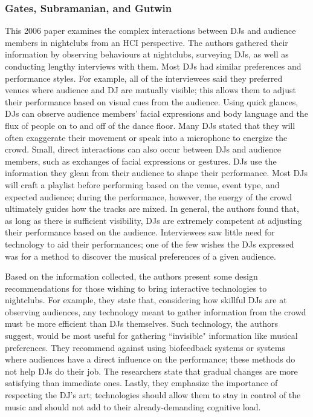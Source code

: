 \subsubsection{Gates, Subramanian, and Gutwin}

This 2006 paper examines the complex interactions between DJs and audience members in nightclubs from an HCI perspective. The authors gathered their information by observing behaviours at nightclubs, surveying DJs, as well as conducting lengthy interviews with them. Most DJs had similar preferences and performance styles. For example, all of the interviewees said they preferred venues where audience and DJ are mutually visible; this allows them to adjust their performance based on visual cues from the audience. Using quick glances, DJs can observe audience members' facial expressions and body language and the flux of people on to and off of the dance floor. Many DJs stated that they will often exaggerate their movement or speak into a microphone to energize the crowd. Small, direct interactions can also occur between DJs and audience members, such as exchanges of facial expressions or gestures. DJs use the information they glean from their audience to shape their performance. Most DJs will craft a playlist before performing based on the venue, event type, and expected audience; during the performance, however, the energy of the crowd ultimately guides how the tracks are mixed. In general, the authors found that, as long as there is sufficient visibility, DJs are extremely competent at adjusting their performance based on the audience. Interviewees saw little need for technology to aid their performances; one of the few wishes the DJs expressed was for a method to discover the musical preferences of a given audience.

Based on the information collected, the authors present some design recommendations for those wishing to bring interactive technologies to nightclubs. For example, they state that, considering how skillful DJs are at observing audiences, any technology meant to gather information from the crowd must be more efficient than DJs themselves. Such technology, the authors suggest, would be most useful for gathering ``invisible" information like musical preferences. They recommend against using biofeedback systems or systems where audiences have a direct influence on the performance; these methods do not help DJs do their job. The researchers state that gradual changes are more satisfying than immediate ones. Lastly, they emphasize the importance of respecting the DJ's art; technologies should allow them to stay in control of the music and should not add to their already-demanding cognitive load.

